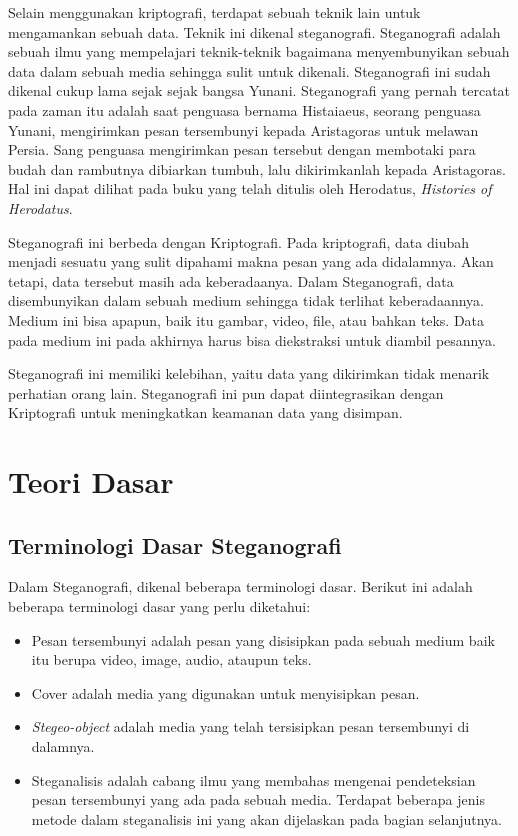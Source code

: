 \documentclass[10pt,conference]{IEEEtran}
\theoremstyle{definition}
\begin{document}
Selain menggunakan kriptografi, terdapat sebuah teknik lain untuk mengamankan sebuah data. Teknik ini dikenal steganografi. 
Steganografi adalah sebuah ilmu yang mempelajari teknik-teknik bagaimana menyembunyikan sebuah data dalam sebuah media sehingga 
sulit untuk dikenali. Steganografi ini sudah dikenal cukup lama sejak sejak bangsa Yunani. Steganografi yang pernah 
tercatat pada zaman itu adalah saat penguasa bernama Histaiaeus, seorang penguasa Yunani, mengirimkan pesan tersembunyi kepada 
Aristagoras untuk melawan Persia. Sang penguasa mengirimkan pesan tersebut dengan membotaki para budah dan rambutnya dibiarkan tumbuh, 
lalu dikirimkanlah kepada Aristagoras. Hal ini dapat dilihat pada buku yang telah ditulis oleh Herodatus, \emph{Histories of Herodatus}. \cite{b1}

Steganografi ini berbeda dengan Kriptografi. Pada kriptografi, data diubah menjadi sesuatu yang sulit dipahami makna pesan yang ada didalamnya. 
Akan tetapi, data tersebut masih ada keberadaanya. Dalam Steganografi, data disembunyikan dalam sebuah medium sehingga tidak terlihat 
keberadaannya. Medium ini bisa apapun, baik itu gambar, video, file, atau bahkan teks. Data pada medium ini pada akhirnya harus bisa 
diekstraksi untuk diambil pesannya.

Steganografi ini memiliki kelebihan, yaitu data yang dikirimkan tidak menarik perhatian orang lain. Steganografi ini pun dapat 
diintegrasikan dengan Kriptografi untuk meningkatkan keamanan data yang disimpan.

\section{Teori Dasar}

\subsection{Terminologi Dasar Steganografi}

Dalam Steganografi, dikenal beberapa terminologi dasar. Berikut ini adalah beberapa terminologi dasar yang perlu diketahui: \cite{b1}

\begin{itemize}
    \item Pesan tersembunyi adalah pesan yang disisipkan pada sebuah medium baik itu berupa video, image, audio, ataupun teks. 
    \item Cover adalah media yang digunakan untuk menyisipkan pesan.
    \item \emph{Stegeo-object} adalah media yang telah tersisipkan pesan tersembunyi di dalamnya.
    \item Steganalisis adalah cabang ilmu yang membahas mengenai pendeteksian pesan tersembunyi yang ada pada sebuah media. Terdapat 
    beberapa jenis metode dalam steganalisis ini yang akan dijelaskan pada bagian selanjutnya.  
\end{itemize}
\end{document}
